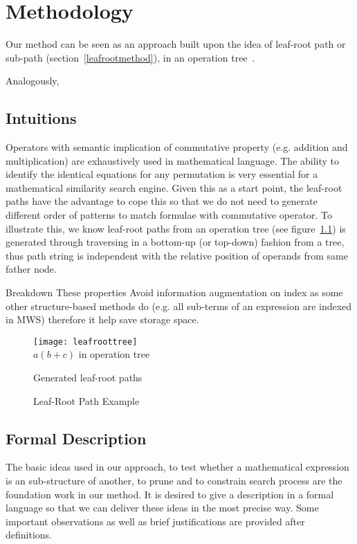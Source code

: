 \chapter{Methodology}
Our method can be seen as an approach built upon the idea of leaf-root path or sub-path (section~\ref{leafrootmethod}), in an operation tree~\cite{goodsurvey}.

Analogously,

\section{Intuitions}
Operators with semantic implication of commutative property (e.g. addition and multiplication) are exhaustively used in mathematical language. The ability to identify the identical equations for any permutation is very essential for a mathematical similarity search engine. 
Given this as a start point, the leaf-root paths have the advantage to cope this so that we do not need to generate different order of patterns to match formulae with commutative operator. 
To illustrate this, we know leaf-root paths from an operation tree (see figure~\ref{oprtreeExample}) is generated through traversing in a bottom-up (or top-down) fashion from a tree, thus path string is independent with the relative position of operands from same father node.

Breakdown
These properties Avoid information augmentation on index as some other structure-based methods do (e.g. all sub-terms of an expression are indexed in MWS) therefore it help save storage space.


\begin{figure}
\begin{minipage}[b]{2.65in}
\begin{center}
\texttt{[image: leafroottree]}
\\$a(b+c)$ in operation tree
\end{center}
\end{minipage}
\hspace*{.38in}
\begin{minipage}[b]{2.65in}
\begin{center}
Generated leaf-root paths
\end{center}
\end{minipage}
\caption{Leaf-Root Path Example}\label{oprtreeExample}
\end{figure}

\section{Formal Description}
The basic ideas used in our approach, to test whether a mathematical expression is an sub-structure of another, to prune and to constrain search process are the foundation work in our method. It is desired to give a description in a formal language so that we can deliver these ideas in the most precise way. Some important observations as well as brief justifications are provided after definitions.

